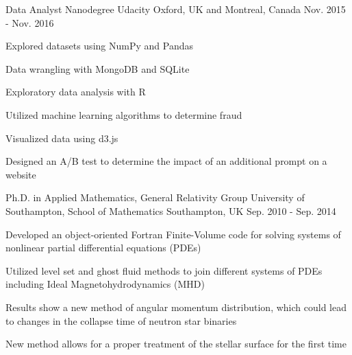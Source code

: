 

\begin{cventries}

  \cventry
    {Data Analyst Nanodegree} %
    {Udacity} %
    {Oxford, UK and Montreal, Canada} %
    {Nov. 2015 - Nov. 2016} %
    {
      \begin{cvitems} %
        \item {Explored datasets using NumPy and Pandas}
        \item {Data wrangling with MongoDB and SQLite}
        \item {Exploratory data analysis with R}
        \item {Utilized machine learning algorithms to determine fraud}
        \item {Visualized data using d3.js}
        \item {Designed an A/B test to determine the impact of an additional prompt on a website}
              \end{cvitems}
    }

  \cventry
    {Ph.D. in Applied Mathematics, General Relativity Group} %
    {University of Southampton, School of Mathematics} %
    {Southampton, UK} %
    {Sep. 2010 - Sep. 2014} %
    {
      \begin{cvitems} %
        \item {Developed an object-oriented Fortran Finite-Volume code for solving systems of nonlinear partial dif\/ferential equations (PDEs)}
        \item{Utilized level set and ghost fluid methods to join dif\/ferent systems of PDEs including Ideal Magnetohydrodynamics (MHD)}
        \item{Results show a new method of angular momentum distribution, which could lead to changes in the collapse time of neutron star binaries}
        \item{New method allows for a proper treatment of the stellar surface for the first time}
              \end{cvitems}
    }


\end{cventries}
